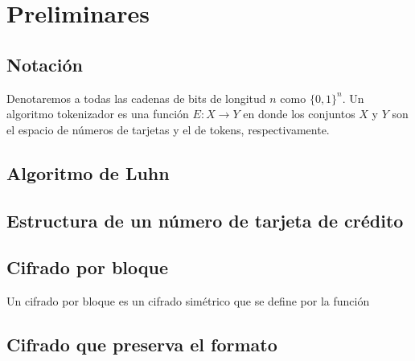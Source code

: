 %
%

\section{Preliminares}



\subsection{Notación}

Denotaremos a todas las cadenas de bits de longitud $ n $ como $ \{ 0, 1 \}^n $. Un algoritmo tokenizador es una función $ E: X \rightarrow Y $ en donde los conjuntos $ X $ y $ Y $ son el espacio de números de tarjetas y el de tokens, respectivamente.

\subsection{Algoritmo de Luhn}

\subsection{Estructura de un número de tarjeta de crédito}

\subsection{Cifrado por bloque}

Un cifrado por bloque es un cifrado simétrico que se define por la función $  $

\subsection{Cifrado que preserva el formato}



